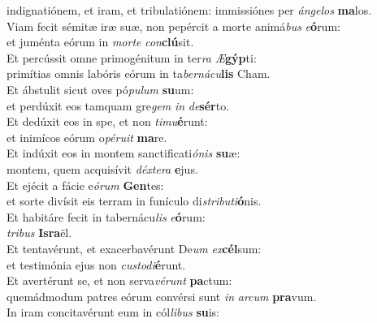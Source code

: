 \evenverse indignatiónem, et iram, et tribulatiónem: immissiónes per \textit{án}\textit{ge}\textit{los} \textbf{ma}los.\\
\oddverse Viam fecit sémitæ iræ suæ, non pepércit a morte animá\textit{bus} \textit{e}\textbf{ó}rum:~\*\\
\oddverse et juménta eórum in \textit{mor}\textit{te} \textit{con}\textbf{clú}sit.\\
\evenverse Et percússit omne primogénitum in ter\textit{ra} \textit{Æ}\textbf{gýp}ti:~\*\\
\evenverse primítias omnis labóris eórum in ta\textit{ber}\textit{ná}\textit{cu}\textbf{lis} Cham.\\
\oddverse Et ábstulit sicut oves pó\textit{pu}\textit{lum} \textbf{su}um:~\*\\
\oddverse et perdúxit eos tamquam gre\textit{gem} \textit{in} \textit{de}\textbf{sér}to.\\
\evenverse Et dedúxit eos in spe, et non \textit{ti}\textit{mu}\textbf{é}runt:~\*\\
\evenverse et inimícos eórum o\textit{pé}\textit{ru}\textit{it} \textbf{ma}re.\\
\oddverse Et indúxit eos in montem sanctificati\textit{ó}\textit{nis} \textbf{su}æ:~\*\\
\oddverse montem, quem acquisívit \textit{déx}\textit{te}\textit{ra} \textbf{e}jus.\\
\evenverse Et ejécit a fácie e\textit{ó}\textit{rum} \textbf{Gen}tes:~\*\\
\evenverse et sorte divísit eis terram in funículo di\textit{stri}\textit{bu}\textit{ti}\textbf{ó}nis.\\
\oddverse Et habitáre fecit in tabernácu\textit{lis} \textit{e}\textbf{ó}rum:~\*\\
\oddverse \textit{tri}\textit{bus} \textbf{Is}\textbf{ra}ël.\\
\evenverse Et tentavérunt, et exacerbavérunt De\textit{um} \textit{ex}\textbf{cél}sum:~\*\\
\evenverse et testimónia ejus non \textit{cu}\textit{sto}\textit{di}\textbf{é}runt.\\
\oddverse Et avertérunt se, et non serva\textit{vé}\textit{runt} \textbf{pa}ctum:~\*\\
\oddverse quemádmodum patres eórum convérsi sunt \textit{in} \textit{ar}\textit{cum} \textbf{pra}vum.\\
\evenverse In iram concitavérunt eum in cól\textit{li}\textit{bus} \textbf{su}is:~\*\\
